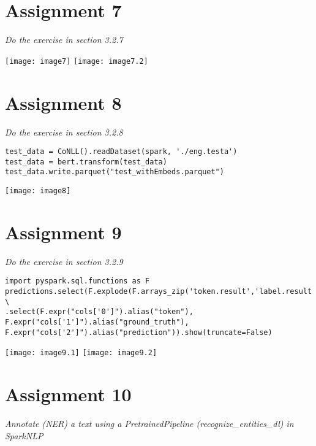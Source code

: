 \documentclass[]{article}
\begin{document}
\section*{Assignment 7}
\emph{ Do the exercise in section 3.2.7 }

\texttt{[image: image7]} %
\texttt{[image: image7.2]} %

\section*{Assignment 8}
\emph{ Do the exercise in section 3.2.8 }

\begin{verbatim}
test_data = CoNLL().readDataset(spark, './eng.testa')
test_data = bert.transform(test_data)
test_data.write.parquet("test_withEmbeds.parquet")
\end{verbatim}
\texttt{[image: image8]} %


\section*{Assignment 9}
\emph{ Do the exercise in section 3.2.9 }

\begin{verbatim}
import pyspark.sql.functions as F 
predictions.select(F.explode(F.arrays_zip('token.result','label.result','ner.result')).alias("cols")) \
.select(F.expr("cols['0']").alias("token"),
F.expr("cols['1']").alias("ground_truth"),
F.expr("cols['2']").alias("prediction")).show(truncate=False)
\end{verbatim}
\texttt{[image: image9.1]} %
\texttt{[image: image9.2]} %

\section*{Assignment 10}
\emph{ Annotate (NER) a text using a PretrainedPipeline (recognize\_entities\_dl) in SparkNLP }
\end{document}
